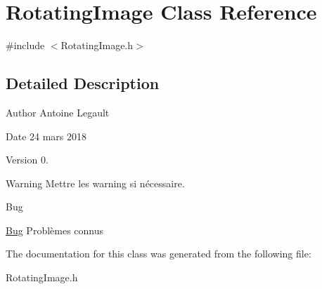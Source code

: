 \hypertarget{class_rotating_image}{}\section{Rotating\+Image Class Reference}
\label{class_rotating_image}


{\ttfamily \#include $<$Rotating\+Image.\+h$>$}



\subsection{Detailed Description}
\begin{DoxyAuthor}{Author}
Antoine Legault 
\end{DoxyAuthor}
\begin{DoxyDate}{Date}
24 mars 2018 
\end{DoxyDate}
\begin{DoxyVersion}{Version}
0. 
\end{DoxyVersion}
\begin{DoxyWarning}{Warning}
Mettre les warning si nécessaire. 
\end{DoxyWarning}
\begin{DoxyRefDesc}{Bug}
\item[\hyperlink{bug__bug000017}{Bug}]Problèmes connus \end{DoxyRefDesc}


The documentation for this class was generated from the following file\+:\begin{DoxyCompactItemize}
\item 
Rotating\+Image.\+h\end{DoxyCompactItemize}

